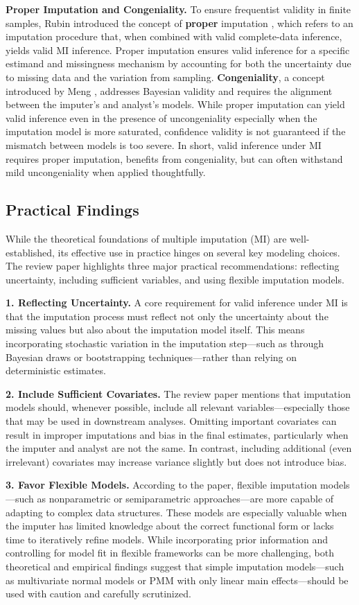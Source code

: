 \documentclass[12pt,oneside]{amsart}
\theoremstyle{definition}
\theoremstyle{remark}
\numberwithin{equation}{section}
\begin{document}
\textbf{Proper Imputation and Congeniality.} 
To ensure frequentist validity in finite samples, Rubin introduced the concept of \textbf{proper} imputation \citep{rubin}, which refers to an imputation procedure that, when combined with valid complete-data inference, yields valid MI inference. Proper imputation ensures valid inference for a specific estimand and missingness mechanism by accounting for both the uncertainty due to missing data and the variation from sampling. \textbf{Congeniality}, a concept introduced by Meng \citep{meng}, addresses Bayesian validity and requires the alignment between the imputer’s and analyst’s models. While proper imputation can yield valid inference even in the presence of uncongeniality especially when the imputation model is more saturated, confidence validity is not guaranteed if the mismatch between models is too severe. In short, valid inference under MI requires proper imputation, benefits from congeniality, but can often withstand mild uncongeniality when applied thoughtfully.

\subsection{Practical Findings}
While the theoretical foundations of multiple imputation (MI) are well-established, its effective use in practice hinges on several key modeling choices. The review paper highlights three major practical recommendations: reflecting uncertainty, including sufficient variables, and using flexible imputation models.

\textbf{1. Reflecting Uncertainty.}
 A core requirement for valid inference under MI is that the imputation process must reflect not only the uncertainty about the missing values but also about the imputation model itself. This means incorporating stochastic variation in the imputation step—such as through Bayesian draws or bootstrapping techniques—rather than relying on deterministic estimates.

\textbf{2. Include Sufficient Covariates.}
 The review paper mentions that imputation models should, whenever possible, include all relevant variables—especially those that may be used in downstream analyses. Omitting important covariates can result in improper imputations and bias in the final estimates, particularly when the imputer and analyst are not the same. In contrast, including additional (even irrelevant) covariates may increase variance slightly but does not introduce bias. 

\textbf{3. Favor Flexible Models.}
 According to the paper, flexible imputation models—such as nonparametric or semiparametric approaches—are more capable of adapting to complex data structures. These models are especially valuable when the imputer has limited knowledge about the correct functional form or lacks time to iteratively refine models. While incorporating prior information and controlling for model fit in flexible frameworks can be more challenging, both theoretical and empirical findings suggest that simple imputation models—such as multivariate normal models or PMM with only linear main effects—should be used with caution and carefully scrutinized.
 
\end{document}
